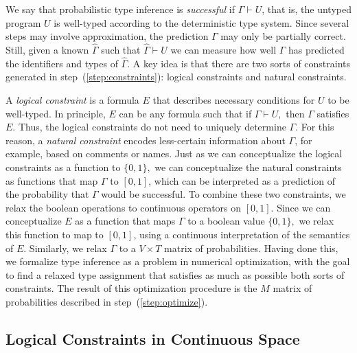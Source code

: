 \documentclass[sigplan,10pt,anonymous]{acmart} %
\theoremstyle{plain}
\theoremstyle{remark}
\theoremstyle{definition}
\begin{document}
We say that probabilistic type inference is \emph{successful} if $\Gamma \vdash U$, that is, the untyped program $U$ is well-typed according to the deterministic type system.
%
Since several steps may involve approximation, the prediction $\Gamma$ may only be partially correct.
%
Still, given a known $\hat{\Gamma}$ such that $\hat{\Gamma} \vdash U$ we can measure how well $\Gamma$ has predicted the identifiers and types of $\hat{\Gamma}$.
%
A key idea is that there are two sorts of constraints generated in step~(\ref{step:constraints}): logical constraints and natural
constraints.

A \emph{logical constraint} is a formula $E$ that describes
necessary conditions for $U$ to be well-typed.
In principle, $E$ can be any formula such that if $\Gamma \vdash U,$
then $\Gamma$ satisfies $E$.
Thus, the logical constraints
do not need to uniquely determine $\Gamma$.
For this reason, a \emph{natural constraint}
encodes less-certain information about $\Gamma$,
for example, based on comments or names.
Just as we can conceptualize the logical
constraints as a function to $\{0, 1\},$
we can conceptualize the natural constraints as functions
that map $\Gamma$ to $[0, 1]$, which can be interpreted
as a prediction of the probability that $\Gamma$ would
be successful. To combine these two constraints, we relax the boolean operations to continuous operators on $[0, 1]$.
Since we can conceptualize $E$ as a function
that maps $\Gamma$ to a boolean value $\{0, 1\},$
we relax this function to map to $[0,1]$, using
a continuous interpretation of the semantics of $E.$
Similarly, we relax $\Gamma$ to a $V \times T$ matrix of probabilities.
Having done this,
we formalize type inference as a problem in
numerical optimization, with the goal to find a relaxed type assignment
that satisfies as much as possible both sorts of constraints.
The result of this optimization procedure is the
$M$ matrix of probabilities described in step~(\ref{step:optimize}).

\subsection{Logical Constraints in Continuous Space}\label{ssec:logcon}
\end{document}
